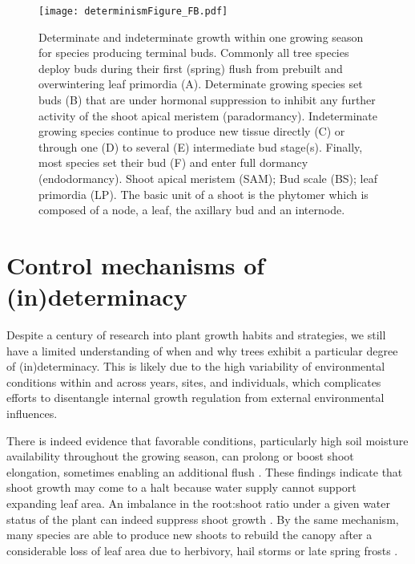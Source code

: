 \documentclass{article}
\begin{document}
								\begin{figure}
								\centering
								\texttt{[image: determinismFigure\_FB.pdf]} 
								\caption{Determinate and indeterminate growth within one growing season for species producing terminal buds. Commonly all tree species deploy buds during their first (spring) flush from prebuilt and overwintering leaf primordia (A). Determinate growing species set buds (B) that are under hormonal suppression to inhibit any further activity of the shoot apical meristem (paradormancy). Indeterminate growing species continue to produce new tissue directly (C) or through one (D) to several (E) intermediate bud stage(s). Finally, most species set their bud (F) and enter full dormancy (endodormancy). Shoot apical meristem (SAM); Bud scale (BS); leaf primordia (LP). The basic unit of a shoot is the phytomer which is composed of a node, a leaf, the axillary bud and an internode.}
								\label{fig:fig_2xxx}
								\end{figure}
								
	\section*{Control mechanisms of (in)determinacy}
	Despite a century of research into plant growth habits and strategies, we still have a limited understanding of when and why trees exhibit a particular degree of (in)determinacy. This is likely due to the high variability of environmental conditions within and across years, sites, and individuals, which complicates efforts to disentangle internal growth regulation from external environmental influences.
	
	There is indeed evidence that favorable conditions, particularly high soil moisture availability throughout the growing season, can prolong or boost shoot elongation, sometimes enabling an additional flush \citep{kayaAdaptiveSignificanceIntermittent1994}. 
	These findings indicate that shoot growth may come to a halt because water supply cannot support expanding leaf area. An imbalance in the root:shoot ratio under a given water status of the plant can indeed suppress shoot growth \citet{borchertSimulationRhythmicTree1973}. By the same mechanism, many species are able to produce new shoots to rebuild the canopy after a considerable loss of leaf area due to herbivory, hail storms or late spring frosts \citep{baumgartenNoRiskNo2023a}.  \\
	
\end{document}
